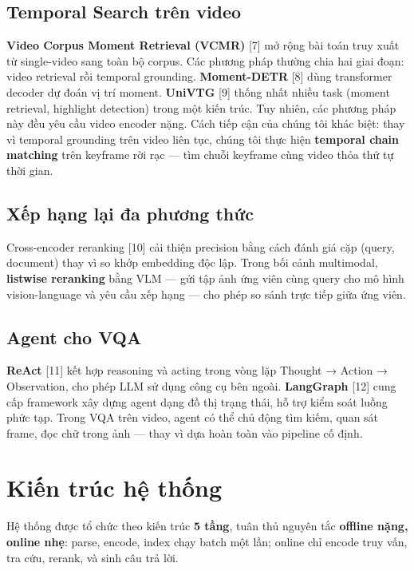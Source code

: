 \documentclass[12pt,a4paper,onecolumn]{article}
\begin{document}
\subsection{Temporal Search trên video}

\textbf{Video Corpus Moment Retrieval (VCMR)} [7] mở rộng bài toán truy xuất từ single-video sang toàn bộ corpus. Các phương pháp thường chia hai giai đoạn: video retrieval rồi temporal grounding. \textbf{Moment-DETR} [8] dùng transformer decoder dự đoán vị trí moment. \textbf{UniVTG} [9] thống nhất nhiều task (moment retrieval, highlight detection) trong một kiến trúc. Tuy nhiên, các phương pháp này đều yêu cầu video encoder nặng. Cách tiếp cận của chúng tôi khác biệt: thay vì temporal grounding trên video liên tục, chúng tôi thực hiện \textbf{temporal chain matching} trên keyframe rời rạc — tìm chuỗi keyframe cùng video thỏa thứ tự thời gian.

\subsection{Xếp hạng lại đa phương thức}

Cross-encoder reranking [10] cải thiện precision bằng cách đánh giá cặp (query, document) thay vì so khớp embedding độc lập. Trong bối cảnh multimodal, \textbf{listwise reranking} bằng VLM — gửi tập ảnh ứng viên cùng query cho mô hình vision-language và yêu cầu xếp hạng — cho phép so sánh trực tiếp giữa ứng viên.

\subsection{Agent cho VQA}

\textbf{ReAct} [11] kết hợp reasoning và acting trong vòng lặp Thought → Action → Observation, cho phép LLM sử dụng công cụ bên ngoài. \textbf{LangGraph} [12] cung cấp framework xây dựng agent dạng đồ thị trạng thái, hỗ trợ kiểm soát luồng phức tạp. Trong VQA trên video, agent có thể chủ động tìm kiếm, quan sát frame, đọc chữ trong ảnh — thay vì dựa hoàn toàn vào pipeline cố định.

\section{Kiến trúc hệ thống}

Hệ thống được tổ chức theo kiến trúc \textbf{5 tầng}, tuân thủ nguyên tắc \textbf{offline nặng, online nhẹ}: parse, encode, index chạy batch một lần; online chỉ encode truy vấn, tra cứu, rerank, và sinh câu trả lời.
\end{document}
